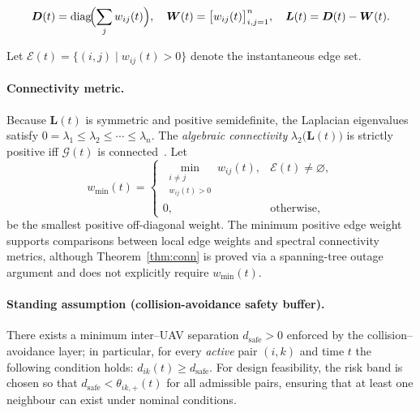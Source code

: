 \documentclass[preprint,12pt]{elsarticle}
\theoremstyle{definition}\newtheorem{definition}{Definition}
\theoremstyle{plain}\newtheorem{theorem}{Theorem}
\theoremstyle{plain}\newtheorem{lemma}{Lemma}
\theoremstyle{plain}\newtheorem{corollary}{Corollary}
\theoremstyle{plain}\newtheorem{assumption}{Assumption}
\theoremstyle{remark}\newtheorem{remark}[theorem]{Remark}
\begin{document}
\[
  \boldsymbol D(t)=\operatorname{diag}\!\Bigl(\sum_{j}w_{ij}(t)\Bigr),\quad
  \boldsymbol W(t)=\bigl[w_{ij}(t)\bigr]_{i,j=1}^{n},\quad
  \boldsymbol L(t)=\boldsymbol D(t)-\boldsymbol W(t).
\]

Let \(\mathcal E(t)=\{(i,j) \mid w_{ij}(t)>0\}\) denote the instantaneous edge set.

\paragraph{Connectivity metric.}
Because \(\boldsymbol L(t)\) is symmetric and positive semidefinite,
the Laplacian eigenvalues satisfy \(0=\lambda_1\le\lambda_2\le\cdots\le\lambda_n\).
The \emph{algebraic connectivity}
\(\lambda_2\bigl(\boldsymbol L(t)\bigr)\) is strictly positive
iff \(\mathcal G(t)\) is connected~\cite{mesbahi2010graph}.  Let
\begin{equation}
  w_{\min}(t)=
  \begin{cases}
    \displaystyle
    \min_{\substack{i\neq j\\ w_{ij}(t)>0}} w_{ij}(t), & \mathcal E(t)\neq\varnothing,\\[6pt]
    0, & \text{otherwise},
  \end{cases}
  \label{eq:wmin}
\end{equation}
be the smallest positive off-diagonal weight. The minimum positive edge weight supports comparisons between local edge weights and spectral connectivity metrics,
although Theorem~\ref{thm:conn} is proved via a spanning-tree outage argument and does not explicitly require $w_{\min}(t)$.

\paragraph*{Standing assumption (collision-avoidance safety buffer).} There exists a minimum inter--UAV separation $d_{\mathrm{safe}}>0$
enforced by the collision--avoidance layer; in particular, for every \emph{active} pair $(i,k)$ and time $t$ the following condition holds:
$d_{ik}(t)\ge d_{\mathrm{safe}}$. For design feasibility, the risk band is chosen so that $d_{\mathrm{safe}}<\theta_{ik,+}(t)$ for all admissible pairs, ensuring that at least one neighbour can exist under nominal conditions.
\end{document}
